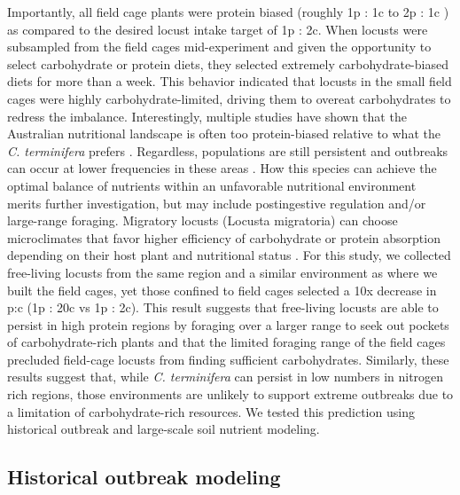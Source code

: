 \documentclass[
]{article}
\begin{document}
Importantly, all field cage plants were protein biased (roughly 1p : 1c
to 2p : 1c ) as compared to the desired locust intake target of 1p : 2c.
When locusts were subsampled from the field cages mid-experiment and
given the opportunity to select carbohydrate or protein diets, they
selected extremely carbohydrate-biased diets for more than a week. This
behavior indicated that locusts in the small field cages were highly
carbohydrate-limited, driving them to overeat carbohydrates to redress
the imbalance. Interestingly, multiple studies have shown that the
Australian nutritional landscape is often too protein-biased relative to
what the \emph{C. terminifera} prefers
\citep{lawton_woody_2020, lawton_mismatched_2021}. Regardless,
populations are still persistent and outbreaks can occur at lower
frequencies in these areas
\citep{deveson_satellite_2013, key_general_1945}. How this species can
achieve the optimal balance of nutrients within an unfavorable
nutritional environment merits further investigation, but may include
postingestive regulation and/or large-range foraging. Migratory locusts
(Locusta migratoria) can choose microclimates that favor higher
efficiency of carbohydrate or protein absorption depending on their host
plant and nutritional status \citep{clissold_insect_2013}. For this
study, we collected free-living locusts from the same region and a
similar environment as where we built the field cages, yet those
confined to field cages selected a 10x decrease in p:c (1p : 20c vs 1p :
2c). This result suggests that free-living locusts are able to persist
in high protein regions by foraging over a larger range to seek out
pockets of carbohydrate-rich plants and that the limited foraging range
of the field cages precluded field-cage locusts from finding sufficient
carbohydrates. Similarly, these results suggest that, while \emph{C.
terminifera} can persist in low numbers in nitrogen rich regions, those
environments are unlikely to support extreme outbreaks due to a
limitation of carbohydrate-rich resources. We tested this prediction
using historical outbreak and large-scale soil nutrient modeling.

\subsection{Historical outbreak
modeling}\label{historical-outbreak-modeling}
\end{document}
